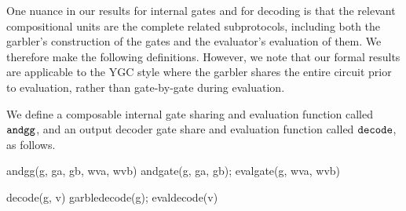 One nuance in our results for internal gates and for decoding is that the relevant
compositional units are the complete related subprotocols, including both
the garbler's construction of the gates and the evaluator's evaluation of
them. We therefore make the following definitions. However, we note that
our formal results are applicable to the YGC style where the garbler shares
the entire circuit prior to evaluation, rather than gate-by-gate during
evaluation. 
\begin{definition}
  \label{ygc-modules}
  We define a composable internal  gate sharing and evaluation function
  called $\texttt{andgg}$, and an output decoder gate share and evaluation function called
  $\texttt{decode}$, as follows. 
\begin{verbatimtab}
  andgg(g, ga, gb, wva, wvb) { andgate(g, ga, gb); evalgate(g, wva, wvb) }
 
  decode(g, v) { garbledecode(g); evaldecode(v) }
\end{verbatimtab}
\end{definition}


